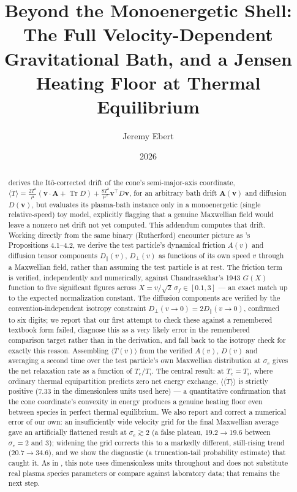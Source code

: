 \documentclass[12pt]{amsart}
\title[Velocity-Dependent Baths on the AM--GM Cone]{Beyond the Monoenergetic Shell:\\
The Full Velocity-Dependent Gravitational Bath, and a Jensen Heating Floor at Thermal Equilibrium}
\author{Jeremy Ebert}
\date{2026}
\theoremstyle{plain}
\theoremstyle{remark}
\begin{document}
\maketitle

\begin{abstract}
\cite{EbertBath2026} derives the It\^o-corrected drift of the cone's semi-major-axis coordinate, $\langle\dot T\rangle=\frac{2T^2}{\mu}(\mathbf v\cdot\mathbf A+\operatorname{Tr}D)+\frac{8T^3}{\mu^2}\mathbf v^\top D\mathbf v$, for an arbitrary bath drift $\mathbf A(\mathbf v)$ and diffusion $D(\mathbf v)$, but evaluates its plasma-bath instance only in a monoenergetic (single relative-speed) toy model, explicitly flagging that a genuine Maxwellian field would leave a nonzero net drift not yet computed. This addendum computes that drift. Working directly from the same binary (Rutherford) encounter picture as \cite{EbertBath2026}'s Propositions 4.1--4.2, we derive the test particle's dynamical friction $A(v)$ and diffusion tensor components $D_\parallel(v)$, $D_\perp(v)$ as functions of its own speed $v$ through a Maxwellian field, rather than assuming the test particle is at rest. The friction term is verified, independently and numerically, against Chandrasekhar's 1943 $G(X)$ function to five significant figures across $X=v/\sqrt2\,\sigma_f\in[0.1,3]$ --- an exact match up to the expected normalization constant. The diffusion components are verified by the convention-independent isotropy constraint $D_\perp(v{\to}0)=2D_\parallel(v{\to}0)$, confirmed to six digits; we report that our first attempt to check these against a remembered textbook form failed, diagnose this as a very likely error in the remembered comparison target rather than in the derivation, and fall back to the isotropy check for exactly this reason. Assembling $\langle\dot T(v)\rangle$ from the verified $A(v)$, $D(v)$ and averaging a second time over the test particle's own Maxwellian distribution at $\sigma_e$ gives the net relaxation rate as a function of $T_e/T_i$. The central result: at $T_e=T_i$, where ordinary thermal equipartition predicts zero net energy exchange, $\langle\langle\dot T\rangle\rangle$ is strictly positive ($7.33$ in the dimensionless units used here) --- a quantitative confirmation that the cone coordinate's convexity in energy produces a genuine heating floor even between species in perfect thermal equilibrium. We also report and correct a numerical error of our own: an insufficiently wide velocity grid for the final Maxwellian average gave an artificially flattened result at $\sigma_e\gtrsim2$ (a false plateau, $19.2\to19.6$ between $\sigma_e=2$ and $3$); widening the grid corrects this to a markedly different, still-rising trend ($20.7\to34.6$), and we show the diagnostic (a truncation-tail probability estimate) that caught it. As in \cite{EbertBath2026}, this note uses dimensionless units throughout and does not substitute real plasma species parameters or compare against laboratory data; that remains the next step.
\end{abstract}
\end{document}
